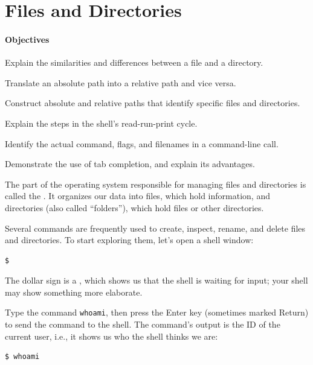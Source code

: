 \documentclass{book}
\begin{document}
\section{Files and Directories}

\mbox{}\paragraph{Objectives}

\begin{swcitemize}
\item
  Explain the similarities and differences between a file and a
  directory.
\item
  Translate an absolute path into a relative path and vice versa.
\item
  Construct absolute and relative paths that identify specific files and
  directories.
\item
  Explain the steps in the shell's read-run-print cycle.
\item
  Identify the actual command, flags, and filenames in a command-line
  call.
\item
  Demonstrate the use of tab completion, and explain its advantages.
\end{swcitemize}

The part of the operating system responsible for managing files and
directories is called the . It
organizes our data into files, which hold information, and directories
(also called ``folders''), which hold files or other directories.

Several commands are frequently used to create, inspect, rename, and
delete files and directories. To start exploring them, let's open a
shell window:

\begin{verbatim}
$
\end{verbatim}

The dollar sign is a , which shows us that
the shell is waiting for input; your shell may show something more
elaborate.

Type the command \texttt{whoami}, then press the Enter key (sometimes
marked Return) to send the command to the shell. The command's output is
the ID of the current user, i.e., it shows us who the shell thinks we
are:

\begin{verbatim}
$ whoami
\end{verbatim}
\end{document}
